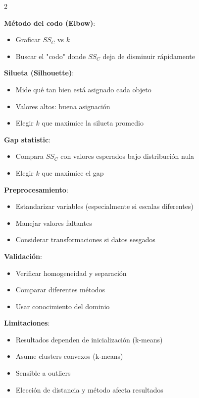 \documentclass[10pt,a4paper]{article}
\begin{document}
\begin{multicols}{2}
    \begin{tcolorbox}[title=Determinación del Número de Clusters, equal height group=CL7]
        \textbf{Método del codo (Elbow)}:
        \begin{itemize}
            \item Graficar $SS_C$ vs $k$
            \item Buscar el "codo" donde $SS_C$ deja de disminuir rápidamente
        \end{itemize}
        
        \textbf{Silueta (Silhouette)}:
        \begin{itemize}
            \item Mide qué tan bien está asignado cada objeto
            \item Valores altos: buena asignación
            \item Elegir $k$ que maximice la silueta promedio
        \end{itemize}
        
        \textbf{Gap statistic}:
        \begin{itemize}
            \item Compara $SS_C$ con valores esperados bajo distribución nula
            \item Elegir $k$ que maximice el gap
        \end{itemize}
    \end{tcolorbox}
    \begin{tcolorbox}[title=Consideraciones Finales, equal height group=CL7]
        \textbf{Preprocesamiento}:
        \begin{itemize}
            \item Estandarizar variables (especialmente si escalas diferentes)
            \item Manejar valores faltantes
            \item Considerar transformaciones si datos sesgados
        \end{itemize}
        
        \textbf{Validación}:
        \begin{itemize}
            \item Verificar homogeneidad y separación
            \item Comparar diferentes métodos
            \item Usar conocimiento del dominio
        \end{itemize}
        
        \textbf{Limitaciones}:
        \begin{itemize}
            \item Resultados dependen de inicialización (k-means)
            \item Asume clusters convexos (k-means)
            \item Sensible a outliers
            \item Elección de distancia y método afecta resultados
        \end{itemize}
    \end{tcolorbox}
\end{multicols}
\end{document}
